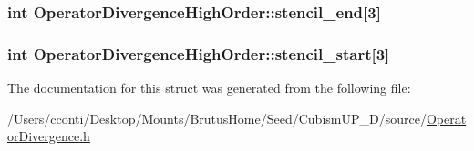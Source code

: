 \subsubsection[{stencil\+\_\+end}]{\setlength{\rightskip}{0pt plus 5cm}int Operator\+Divergence\+High\+Order\+::stencil\+\_\+end\mbox{[}3\mbox{]}}\label{struct_operator_divergence_high_order_a6021365d2be563a3febbf4e4bad3cd28}
\hypertarget{struct_operator_divergence_high_order_acb20b4fc7f077941f6328716a1607e13}{}
\subsubsection[{stencil\+\_\+start}]{\setlength{\rightskip}{0pt plus 5cm}int Operator\+Divergence\+High\+Order\+::stencil\+\_\+start\mbox{[}3\mbox{]}}\label{struct_operator_divergence_high_order_acb20b4fc7f077941f6328716a1607e13}


The documentation for this struct was generated from the following file\+:\begin{DoxyCompactItemize}
\item 
/\+Users/cconti/\+Desktop/\+Mounts/\+Brutus\+Home/\+Seed/\+Cubism\+U\+P\+\_\+D/source/\hyperlink{_operator_divergence_8h}{Operator\+Divergence.\+h}\end{DoxyCompactItemize}
